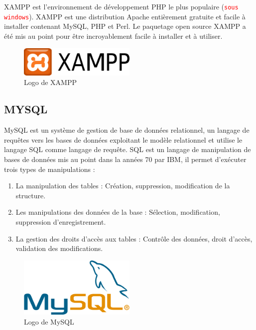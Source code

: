 \documentclass[french]{report}
\newcommand\rmq[1]{\textcolor{red}{\tt #1}}
\begin{document}
XAMPP est l'environnement de développement PHP le plus populaire (\rmq{sous
windows}). XAMPP est une distribution Apache entièrement gratuite et facile à
installer contenant MySQL, PHP et Perl. Le paquetage open source XAMPP a été mis
au point pour être incroyablement facile à installer et à utiliser.

\begin{figure}[H]
    \centering
    \includegraphics[width=0.5\textwidth]{images/1024px-Xampp_logo.svg.png}
    \caption{Logo de XAMPP}
    \label{fig:my_label}
\end{figure}
        
\subsection{MYSQL}
        
MySQL est un système de gestion de base de données relationnel, un langage de
requêtes vers les bases de données exploitant le modèle relationnel et utilise
le langage SQL comme langage de requête. SQL est un langage de manipulation de
bases de données mis au point dans la années 70 par IBM, il permet d'exécuter
trois types de manipulations :

\begin{enumerate}
    \item La manipulation des tables : Création, suppression, modification de la
        structure.
    \item Les manipulations des données de la base : Sélection, modification,
        suppression d'enregistrement.
    \item La gestion des droits d'accès aux tables : Contrôle des données, droit
        d'accès, validation des modifications. \cite{memoire}
\end{enumerate}

\begin{figure}[H]
    \centering
    \includegraphics[width=0.5\textwidth]{images/1200px-MySQL.svg.png}
    \caption{Logo de MySQL}
    \label{fig:my_label}
\end{figure}
\end{document}

